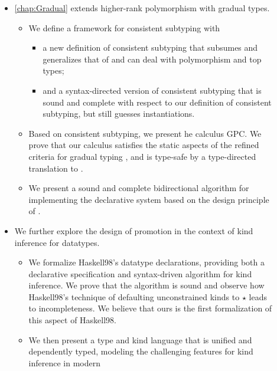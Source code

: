 \begin{description}
\item[]
  \begin{itemize}

  \item \cref{chap:Gradual} extends higher-rank
    polymorphism with gradual types.
    \begin{itemize}
    \item We define a framework for consistent subtyping with
      \begin{itemize}
      \item a new definition of
        consistent subtyping that subsumes and generalizes that of
        \cite{siek:consistent:subtyping} and can deal with polymorphism and top
        types;
      \item and a syntax-directed version of consistent subtyping that is sound
        and complete with respect to our definition of consistent subtyping, but
        still guesses instantiations.
      \end{itemize}
    \item Based on consistent subtyping, we present he calculus GPC. We prove that
      our calculus satisfies the static aspects of the refined criteria for
      gradual typing \citep{siek:criteria}, and is type-safe by a type-directed
      translation to \pbc \citep{amal:blame}.
    \item We present a sound and complete
      bidirectional algorithm for implementing the declarative system based on
      the design principle of \cite{garcia:principal}.
    \end{itemize}
  \item We further explore the design of promotion in the context of kind
    inference for datatypes.
    \begin{itemize}
    \item We formalize Haskell98’s datatype declarations, providing both a
      declarative specification and syntax-driven algorithm for kind inference. We
      prove that the algorithm is sound and observe how Haskell98’s technique of
      defaulting unconstrained kinds to $\star$ leads to incompleteness. We
      believe that ours is the first formalization of this aspect of Haskell98.
    \item We then present a type and kind language that is unified and dependently
      typed, modeling the challenging features for kind inference in modern

\end{itemize}
\end{itemize}
\end{description}
